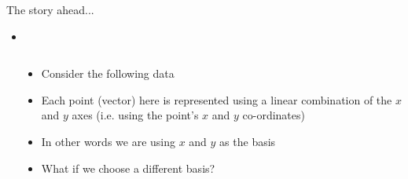 \savestack{\pcabnwnoaxis}{}
\savestack{\pcabnwaxis}{}
\savestack{\pcacolor}{}

\begin{frame}
\end{frame}

\begin{frame}
  \begin{block}{The story ahead...}
    \begin{itemize}\justifying
      \item<2-> 
    \end{itemize}
  \end{block}
\end{frame}



\begin{frame}
  \begin{columns}
    \begin{overlayarea}{\textwidth}{\textheight}
      \makebox[\textwidth][c]{\usebox{\pcabnwnoaxiscontent}}
    \end{overlayarea}

    \begin{overlayarea}{\textwidth}{\textheight}
      \begin{itemize}\justifying
        \item<1-> Consider the following data
        \item<2-> Each point (vector) here is represented using a linear combination of the $x$ and $y$ axes (i.e. using the point's $x$ and $y$ co-ordinates)
        \item<3-> In other words we are using $x$ and $y$ as the basis
        \item<4-> What if we choose a different basis?
      \end{itemize}
    \end{overlayarea}
  \end{columns}
\end{frame}

